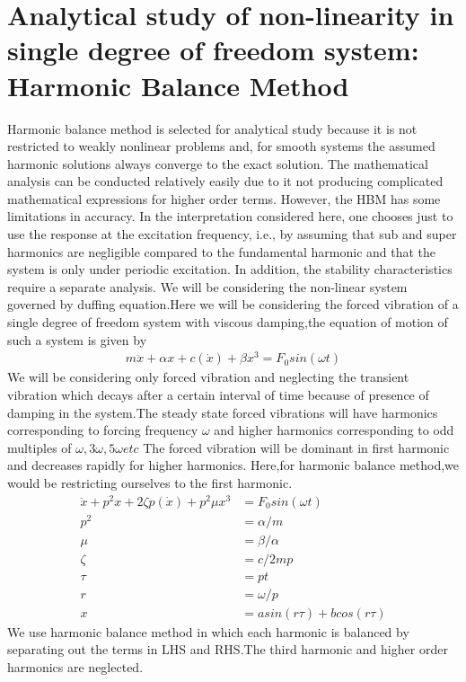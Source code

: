 \chapter{Analytical study of non-linearity in single degree of freedom system:\\Harmonic Balance Method}
Harmonic balance method is selected for analytical study because it is not restricted to weakly nonlinear problems and, for smooth systems the assumed harmonic solutions always converge to the exact solution. The mathematical analysis can be conducted relatively easily due to it not producing complicated mathematical expressions for higher order terms. However, the HBM has some limitations in accuracy. In the interpretation considered here, one chooses just to use the response at the excitation frequency, i.e., by assuming that sub and super harmonics are negligible compared to the fundamental harmonic and that the system is only under periodic excitation. In addition, the stability characteristics require a separate analysis. 
We will be considering the non-linear system governed by duffing equation.Here we will be considering the forced vibration of a single degree of freedom system with viscous damping,the equation of motion of such a system is given by
\begin{align}
m\ddot{x}+\alpha x+c(\dot{x})+\beta x^3=F_0sin(\omega t)
\end{align}
We will be considering only forced vibration and neglecting the transient vibration which decays after a certain interval of time because of presence of damping in the system.The steady state forced vibrations will have harmonics corresponding to forcing frequency $\omega$ and higher harmonics corresponding to odd multiples of $\omega ,3\omega , 5\omega etc$ The forced vibration will be dominant in first harmonic and decreases rapidly for higher harmonics.
Here,for harmonic balance method,we would be restricting ourselves to the first harmonic.
\begin{align}
\ddot{x}+p^2 x+2 \zeta p (\dot{x})+p^2 \mu x^3 &=F_0sin(\omega t)\\
p^2 &= \alpha /m \\
\mu & = \beta / \alpha \\
\zeta &=c/2mp \\
\tau &= pt \\
r &= \omega /p \\
x &= asin(r\tau )+bcos(r\tau)
\end{align}
We use harmonic balance method in which each harmonic is balanced by separating out the terms in LHS and RHS.The third harmonic and higher order harmonics are neglected.
